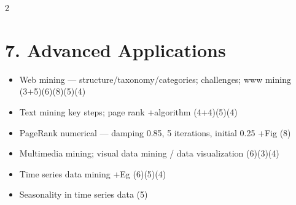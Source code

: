\documentclass[10pt]{article}
\begin{document}
\begin{multicols}{2}
\section*{7. Advanced Applications}
\begin{itemize}
  \item Web mining --- structure/taxonomy/categories; challenges; www mining \hfill (3+5)(6)(8)(5)(4)
  \item Text mining key steps; page rank +algorithm \hfill (4+4)(5)(4)
  \item PageRank numerical --- damping 0.85, 5 iterations, initial 0.25 +Fig \hfill (8)
  \item Multimedia mining; visual data mining / data visualization \hfill (6)(3)(4)
  \item Time series data mining +Eg \hfill (6)(5)(4)
  \item Seasonality in time series data \hfill (5)
\end{itemize}

\end{multicols}
\end{document}
